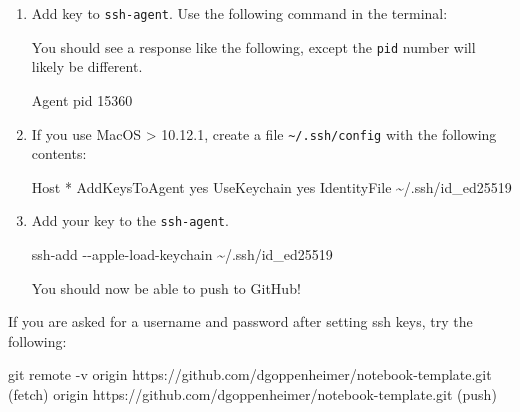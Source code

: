 \documentclass[
  letterpaper,
  DIV=11,
  numbers=noendperiod]{scrreprt}
\newenvironment{Shaded}{\begin{snugshade}}{\end{snugshade}}
\newcommand{\AttributeTok}[1]{\textcolor[rgb]{0.40,0.45,0.13}{#1}}
\newcommand{\BuiltInTok}[1]{\textcolor[rgb]{0.00,0.23,0.31}{#1}}
\newcommand{\ErrorTok}[1]{\textcolor[rgb]{0.68,0.00,0.00}{#1}}
\newcommand{\ExtensionTok}[1]{\textcolor[rgb]{0.00,0.23,0.31}{#1}}
\newcommand{\FunctionTok}[1]{\textcolor[rgb]{0.28,0.35,0.67}{#1}}
\newcommand{\KeywordTok}[1]{\textcolor[rgb]{0.00,0.23,0.31}{#1}}
\newcommand{\NormalTok}[1]{\textcolor[rgb]{0.00,0.23,0.31}{#1}}
\newcommand{\PreprocessorTok}[1]{\textcolor[rgb]{0.68,0.00,0.00}{#1}}
\newcommand{\StringTok}[1]{\textcolor[rgb]{0.13,0.47,0.30}{#1}}
\newcommand{\VariableTok}[1]{\textcolor[rgb]{0.07,0.07,0.07}{#1}}
\begin{document}
\begin{enumerate}
\def\labelenumi{\arabic{enumi}.}
\item
  Add key to \texttt{ssh-agent}. Use the following command in the
  terminal:

\begin{Shaded}
\end{Shaded}

  You should see a response like the following, except the \texttt{pid}
  number will likely be different.

\begin{Shaded}
\begin{Highlighting}[]
\ExtensionTok{Agent}\NormalTok{ pid 15360}
\end{Highlighting}
\end{Shaded}
\item
  If you use MacOS \textgreater{} 10.12.1, create a file
  \texttt{\textasciitilde{}/.ssh/config} with the following contents:

\begin{Shaded}
\begin{Highlighting}[]
\ExtensionTok{Host} \PreprocessorTok{*}
\ExtensionTok{AddKeysToAgent}\NormalTok{ yes}
\ExtensionTok{UseKeychain}\NormalTok{ yes}
\ExtensionTok{IdentityFile}\NormalTok{ \textasciitilde{}/.ssh/id\_ed25519}
\end{Highlighting}
\end{Shaded}
\item
  Add your key to the \texttt{ssh-agent}.

\begin{Shaded}
\begin{Highlighting}[]
\FunctionTok{ssh{-}add} \AttributeTok{{-}{-}apple{-}load{-}keychain}\NormalTok{ \textasciitilde{}/.ssh/id\_ed25519}
\end{Highlighting}
\end{Shaded}

  You should now be able to push to GitHub!
\end{enumerate}

If you are asked for a username and password after setting ssh keys, try
the following:

\begin{Shaded}
\begin{Highlighting}[]
\FunctionTok{git}\NormalTok{ remote }\AttributeTok{{-}v}
\ExtensionTok{origin}\NormalTok{  https://github.com/dgoppenheimer/notebook{-}template.git }\ErrorTok{(}\ExtensionTok{fetch}\KeywordTok{)}
\ExtensionTok{origin}\NormalTok{  https://github.com/dgoppenheimer/notebook{-}template.git }\ErrorTok{(}\ExtensionTok{push}\KeywordTok{)}
\end{Highlighting}
\end{Shaded}
\end{document}
